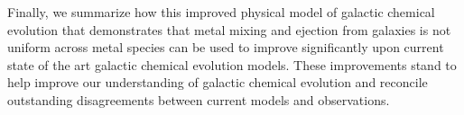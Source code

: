 Finally, we summarize how this improved physical model of galactic chemical evolution that demonstrates that metal mixing and ejection from galaxies is not uniform across metal species can be used to improve significantly upon current state of the art galactic chemical evolution models. These improvements stand to help improve our understanding of galactic chemical evolution and reconcile outstanding disagreements between current models and observations.

